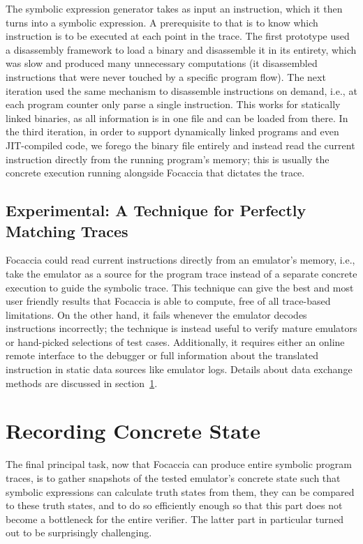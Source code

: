 The symbolic expression generator takes as input an instruction, which it then turns into a symbolic expression. A
prerequisite to that is to know which instruction is to be executed at each point in the trace. The first prototype used
a disassembly framework to load a binary and disassemble it in its entirety, which was slow and produced many
unnecessary computations (it disassembled instructions that were never touched by a specific program flow). The next
iteration used the same mechanism to disassemble instructions on demand, i.e., at each program counter only parse a
single instruction. This works for statically linked binaries, as all information is in one file and can be loaded from
there. In the third iteration, in order to support dynamically linked programs and even \ac{JIT}-compiled code, we
forego the binary file entirely and instead read the current instruction directly from the running program's memory;
this is usually the concrete execution running alongside Focaccia that dictates the trace.

\subsection{Experimental: A Technique for Perfectly Matching Traces}\label{sec:experimental_trace_match}

Focaccia could read current instructions directly from an emulator's memory, i.e., take the emulator as a source for the
program trace instead of a separate concrete execution to guide the symbolic trace. This technique can give the best and
most user friendly results that Focaccia is able to compute, free of all trace-based limitations. On the other hand, it
fails whenever the emulator decodes instructions incorrectly; the technique is instead useful to verify mature emulators
or hand-picked selections of test cases. Additionally, it requires either an online remote interface to the debugger or
full information about the translated instruction in static data sources like emulator logs. Details about data exchange
methods are discussed in section~\ref{sec:recording_state}.

\section{Recording Concrete State}\label{sec:recording_state}

The final principal task, now that Focaccia can produce entire symbolic program traces, is to gather snapshots of the
tested emulator's concrete state such that symbolic expressions can calculate truth states from them, they can be
compared to these truth states, and to do so efficiently enough so that this part does not become a bottleneck for the
entire verifier. The latter part in particular turned out to be surprisingly challenging.

